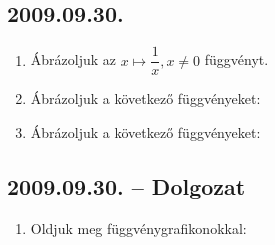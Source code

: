 \subsection*{2009.09.30.}
\begin{enumerate}
\item Ábrázoljuk az $x\mapsto \dfrac{1}{x}, x\ne 0$ függvényt.
\item Ábrázoljuk a következő függvényeket:
\item Ábrázoljuk a következő függvényeket:
\end{enumerate}

\subsection*{2009.09.30. -- Dolgozat}
\begin{enumerate}
\item Oldjuk meg függvénygrafikonokkal:
\end{enumerate}

